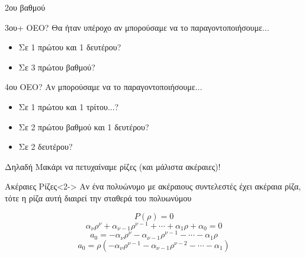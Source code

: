 \documentclass{../presentation}
\begin{document}
\begin{frame}{2ου βαθμού}
  \centering
\end{frame}

\begin{frame}{3ου+ ΟΕΟ?}
  Θα ήταν υπέροχο αν μπορούσαμε να το παραγοντοποιήσουμε...
  \begin{itemize}
    \item<1-> Σε 1 πρώτου και 1 δευτέρου?
    \item<2-> Σε 3 πρώτου βαθμού?
  \end{itemize}
\end{frame}

\begin{frame}{4ου ΟΕΟ?}
  Αν μπορούσαμε να το παραγοντοποιήσουμε...
  \begin{itemize}
    \item<1-> Σε 1 πρώτου και 1 τρίτου...?
    \item<2-> Σε 2 πρώτου βαθμού και 1 δευτέρου?
    \item<3-> Σε 2 δευτέρου?
  \end{itemize}
\end{frame}

\begin{frame}{Δηλαδή}
  Μακάρι να πετυχαίναμε ρίζες (και μάλιστα ακέραιες)!
  \begin{block}{Ακέραιες Ρίζες}<2->
    Αν ένα πολυώνυμο με ακέραιους συντελεστές έχει ακέραια ρίζα, τότε η ρίζα αυτή διαιρεί την σταθερά του πολυωνύμου
  \end{block}
  {$$P(ρ)=0$$ $$α_νρ^ν+α_{ν-1}ρ^{ν-1}+\cdots+α_1ρ+α_0=0$$ $$a_0=-α_νρ^ν-α_{ν-1}ρ^{ν-1}-\cdots-α_1ρ $$ $$a_0=ρ(-α_νρ^{ν-1}-α_{ν-1}ρ^{ν-2}-\cdots-α_1)$$}

\end{frame}
\end{document}
